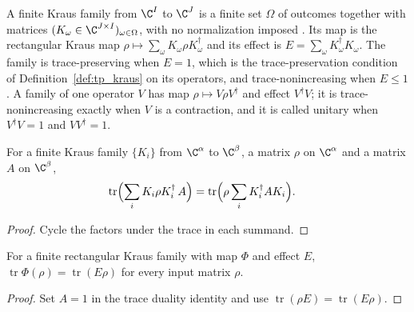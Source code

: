 \begin{definition}
    \label{def:kraus_family}
    \leanok
    A finite Kraus family from $\C^I$ to $\C^J$ is a finite set $\Omega$ of
    outcomes together with matrices $(K_\omega\in\C^{J\times I})_{\omega\in\Omega}$,
    with no normalization imposed \cite[Theorem~2.1]{Wolf2012Quantum}. Its map is
    the rectangular Kraus map $\rho\mapsto\sum_\omega K_\omega\rho K_\omega^\dagger$
    and its effect is $E=\sum_\omega K_\omega^\dagger K_\omega$. The family is
    trace-preserving when $E=1$, which is the trace-preservation condition of
    Definition~\ref{def:tp_kraus} on its operators, and trace-nonincreasing when
    $E\leq1$. A family of one operator $V$ has map $\rho\mapsto V\rho V^\dagger$ and effect $V^\dagger V$; it is trace-nonincreasing exactly
    when $V$ is a contraction, and it is called unitary when
    $V^\dagger V=1$ and $VV^\dagger=1$.
\end{definition}

\begin{lemma}
    \label{lem:kraus_family_trace_duality}
    \leanok
    For a finite Kraus family $\{K_i\}$ from $\C^\alpha$ to $\C^\beta$, a matrix $\rho$ on
    $\C^\alpha$ and a matrix $A$ on $\C^\beta$,
    \begin{align}
        \operatorname{tr}\Bigl(\sum_iK_i\rho K_i^\dagger\,A\Bigr)
        &=\operatorname{tr}\Bigl(\rho\sum_iK_i^\dagger AK_i\Bigr).
        \notag
    \end{align}
\end{lemma}
\begin{proof}\leanok
    Cycle the factors under the trace in each summand.
\end{proof}

\begin{lemma}
    \label{lem:kraus_family_trace_effect}
    \leanok
    For a finite rectangular Kraus family with map $\Phi$ and effect $E$,
    $\operatorname{tr}\Phi(\rho)=\operatorname{tr}(E\rho)$ for every input matrix $\rho$.
\end{lemma}
\begin{proof}\leanok
    Set $A=1$ in the trace duality identity and use
    $\operatorname{tr}(\rho E)=\operatorname{tr}(E\rho)$.
\end{proof}

